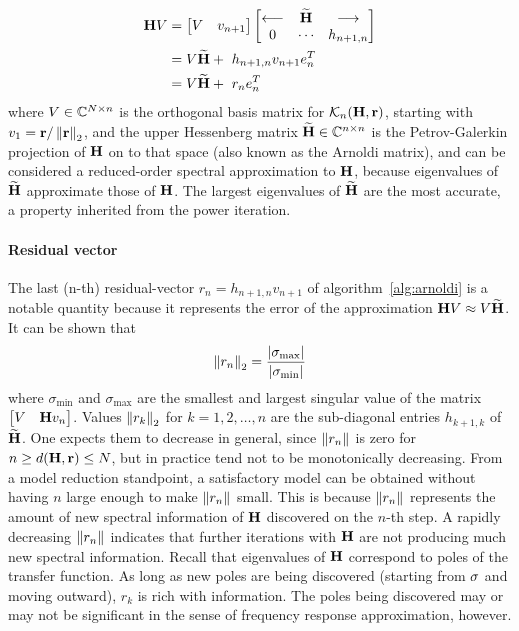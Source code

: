 \begin{equation}     
  \begin{aligned}
           \H V &= \mat{V& v_{n+1}} \mat{\longleftarrow&\Himp& \longrightarrow\\ 0 &\cdots & h_{n+1,n} }  \\
			  &= V\Himp +\ h_{n+1,n} v_{n+1} e_n^{T}\\
			&= V\Himp +\ r_n e_n^{T}
   \end{aligned}
 \label{eq:arnoldi_relation}
\end{equation}
   where $V\in\C^{N\times n}$ is the orthogonal basis matrix for 
   $\krylov{n}{\H}{\Rr}$, starting with $v_1 = \Rr/\nrm{2}{\Rr}$, and the upper Hessenberg matrix 
   $\Himp\in\C^{n\times n}$ 
   is the Petrov-Galerkin projection of $\H$ on to that space (also known as the Arnoldi matrix), and can be considered a reduced-order spectral approximation to $\H$, because eigenvalues of $\Himp$ approximate those of $\H$.    The largest eigenvalues of $\Himp$ are the most accurate, a property inherited from the power iteration.

\paragraph{Residual vector}
The last (n-th) residual-vector $r_n = h_{n+1,n} v_{n+1}$ of algorithm~\ref{alg:arnoldi} is a notable quantity because it represents the error of the approximation $\H V \approx V \Himp$.   It can be shown that 
\[
\nrm{2}{r_n} = \frac{|\sigma_\text{max}|}{|\sigma_\text{min}|}
\]
where $\sigma_\text{min}$ and  $\sigma_\text{max}$ are the smallest and largest singular value of the matrix $\mat{V &\H v_n}$.
Values $\nrm{2}{r_k}$ for $k=1,2,\ldots,n$ are the sub-diagonal entries $h_{k+1,k}$ of $\Himp$.  One expects them to decrease in general, since $\nrm{}{r_n}$ is zero for $n\geq d(\H,\Rr)\leq N$, but in practice tend not to be monotonically decreasing.    From a model reduction standpoint, a satisfactory model can be obtained without having $n$ large enough to make $\nrm{}{r_n}$ small.   This is because $\nrm{}{r_n}$ represents the amount of new spectral information of $\H$ discovered on the $n$-th step.   A rapidly decreasing $\nrm{}{r_n}$ indicates that further iterations with $\H$ are not  producing much new spectral information.    Recall that eigenvalues of $\H$ correspond to poles of the transfer function.   As long as new poles are being discovered (starting from $\xp$ and moving outward), $r_k$ is rich with information.  The poles being discovered may or may not be significant in the sense of frequency response approximation, however.  

